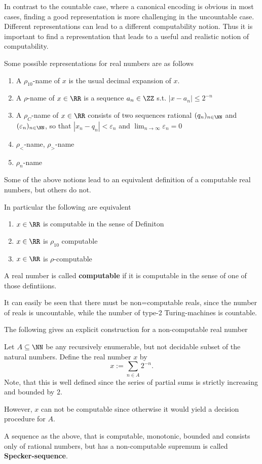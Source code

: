 In contrast to the countable case, where a canonical encoding is obvious in most
cases, finding a good representation is more challenging in the uncountable
case.
Different representations can lead to a different computability notion.
Thus it is important to find a representation that leads to a useful and
realistic notion of computability.

Some possible representations for real numbers are as follows
\begin{enumerate}
\item A $\rho_{10}$-name of $x$ is the usual decimal expansion of $x$.
\item A $\rho$-name of $x \in \RR$ is a sequence $a_n \in \ZZ$ s.t. $| x - a_n | \leq 2^{-n}$
\item  A $\rho_C$-name of $x \in \RR$ consists of two sequences rational $(q_n)_{n \in \NN}$ and $(\varepsilon_n)_{n \in \NN}$, so that 
$| x_n - q_n | < \varepsilon_n$ and $\lim_{n \to \infty} \varepsilon_n = 0$  
\item $\rho_<$-name, $\rho_>$-name
\item $\rho_n$-name 
\end{enumerate}
Some of the above notions lead to an equivalent definition of a computable real
numbers, but others do not.

In particular the following are equivalent
\begin{theorem}
\begin{enumerate}
  \item $x \in \RR$ is computable in the sense of Definiton 
  \item $x \in \RR$ is $\rho_{10}$ computable
  \item $x \in \RR$ is $\rho$-computable
\end{enumerate}
\end{theorem}
A real number is called \textbf{computable} if it is computable in the sense of one of
those defintiions.

It can easily be seen that there must be non=computable reals, since the number
of reals is uncountable, while the number of type-2 Turing-machines is
countable.

The following gives an explicit construction for a non-computable real number
\begin{example}
Let $A \subseteq \NN$ be any recursively enumerable, but not decidable subset
of the natural numbers.
Define the real number $x$ by
$$ x := \sum_{n \in A} 2^{-n}. $$
Note, that this is well defined since the series of partial sums is strictly
increasing and bounded by $2$.

However, $x$ can not be computable since otherwise it would yield a decision
procedure for $A$. 
\end{example}
A sequence as the above, that is computable, monotonic, bounded and consists
only of rational numbers, but has a non-computable supremum is called \textbf{Specker-sequence}.

